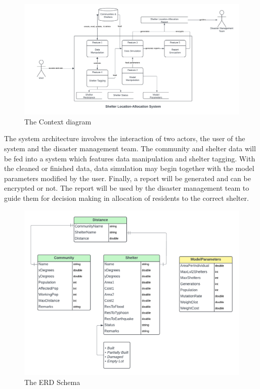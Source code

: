 	\begin{figure}[h!]
		\caption{The Context diagram}
		\centering
		\includegraphics[width=\textwidth]{Context Diagram}
	\end{figure}
	
	The system architecture involves the interaction of two actors, the user of the system and the disaster management team. The community and shelter data will be fed into a system which features data manipulation and shelter tagging. With the cleaned or finished data, data simulation may begin together with the model parameters modified by the user. Finally, a report will be generated and can be encrypted or not. The report will be used by the disaster management team to guide them for decision making in allocation of residents to the correct shelter.

	\begin{figure}[h!]
		\caption{The ERD Schema}
		\centering
		\includegraphics[width=\textwidth]{ERD}
	\end{figure}
	
